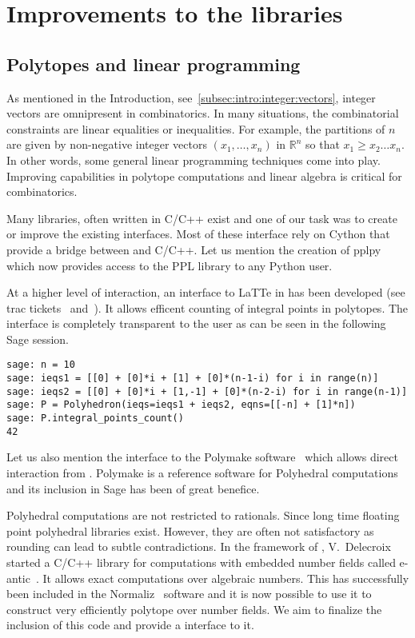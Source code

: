 \documentclass{deliverablereport}
\begin{document}
\section{Improvements to the \Sage libraries}


\subsection{Polytopes and linear programming}
\label{subsec:polytopes}

As mentioned in the Introduction, see~\ref{subsec:intro:integer:vectors},
integer vectors are omnipresent in combinatorics. In many situations,
the combinatorial constraints are linear equalities or inequalities.
For example, the partitions of $n$ are given by non-negative integer
vectors $(x_1, \ldots, x_n)$ in $\mathbb{R}^n$ so that $x_1 \geq x_2 \ldots x_n$.
In other words, some general linear programming techniques come into
play. Improving \Sage capabilities in polytope computations and linear algebra
is critical for combinatorics.

Many libraries, often written in C/C++ exist and one of our task was to
create or improve the existing \Sage interfaces. Most of these interface
rely on Cython that provide a bridge between \Python and C/C++. Let
us mention the creation of pplpy~\cite{pplpy-code} which now provides
access to the PPL library to any Python user.

At a higher level of interaction, an interface to LaTTe in \Sage has
been developed (see trac tickets~\cite{trac-18211}
and~\cite{trac-22497}). It allows efficent counting of
integral points in polytopes. The interface is completely transparent to the
user as can be seen in the following Sage session.
\begin{verbatim}
sage: n = 10
sage: ieqs1 = [[0] + [0]*i + [1] + [0]*(n-1-i) for i in range(n)]
sage: ieqs2 = [[0] + [0]*i + [1,-1] + [0]*(n-2-i) for i in range(n-1)]
sage: P = Polyhedron(ieqs=ieqs1 + ieqs2, eqns=[[-n] + [1]*n])
sage: P.integral_points_count()
42
\end{verbatim}
Let us also mention the \Sage interface to the Polymake
software~\cite{polymake-code} which allows direct interaction from
\Sage. Polymake is a reference software for Polyhedral computations
and its inclusion in Sage has been of great benefice.

Polyhedral computations are not restricted to rationals. Since long time
floating point polyhedral libraries exist. However, they are often not
satisfactory as rounding can lead to subtle contradictions. In the framework
of \ODK, V.~Delecroix started a C/C++ library for computations with embedded
number fields called e-antic~\cite{eantic-code}. It allows exact computations
over algebraic numbers. This has successfully been included in the
Normaliz~\cite{normaliz-code} software and it is now possible to use
it to construct very efficiently polytope over number fields. We aim to
finalize the inclusion of this code and provide a \Sage interface to it.
\end{document}
